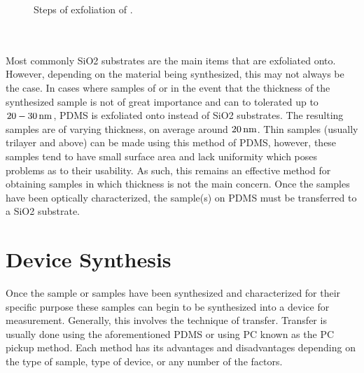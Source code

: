 \begin{figure}[ht]
	\centering
	\caption[Exfoliation steps]{Steps of exfoliation of .}
	\label{fig:exfoliation_steps}
\end{figure}
\\ \\
\noindent Most commonly \acs{SiO2} substrates are the main items that are exfoliated onto. However, depending on the material being synthesized, this may not always be the case. In cases where samples of \hbn or in the event that the thickness of the synthesized sample is not of great importance and can to tolerated up to $20-30\,\mathrm{nm}$, \ac{PDMS} is exfoliated onto instead of \acs{SiO2} substrates. The resulting samples are of varying thickness, on average around $20\,\mathrm{nm}$. Thin samples (usually trilayer and above) can be made using this method of \acs{PDMS}, however, these samples tend to have small surface area and lack uniformity which poses problems as to their usability. As such, this remains an effective method for obtaining samples in which thickness is not the main concern. Once the samples have been optically characterized, the sample(s) on \acs{PDMS} must be transferred to a \acs{SiO2} substrate.

\section{Device Synthesis}\label{sec:synthesis}
Once the sample or samples have been synthesized and characterized for their specific purpose these samples can begin to be synthesized into a device for measurement. Generally, this involves the technique of transfer. Transfer is usually done using the aforementioned \acs{PDMS} or using \ac{PC} known as the \acs{PC} pickup method. Each method has its advantages and disadvantages depending on the type of sample, type of device, or any number of the factors.
%

